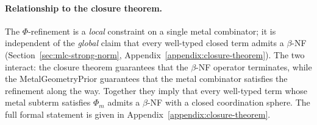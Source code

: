 \paragraph{Relationship to the closure theorem.}
The $\Phi$-refinement is a \emph{local} constraint on a single
metal combinator; it is independent of the
\emph{global} claim that every well-typed closed term admits a
$\beta$-NF (Section~\ref{sec:mlc-strong-norm}, Appendix~\ref{appendix:closure-theorem}).
The two interact: the closure theorem guarantees that the
$\beta$-NF operator terminates, while the
MetalGeometryPrior guarantees that the metal combinator satisfies
the refinement along the way. Together they imply that every
well-typed term whose metal subterm satisfies $\Phi_{m}$ admits a
$\beta$-NF with a closed coordination sphere. The full formal
statement is given in Appendix~\ref{appendix:closure-theorem}.

